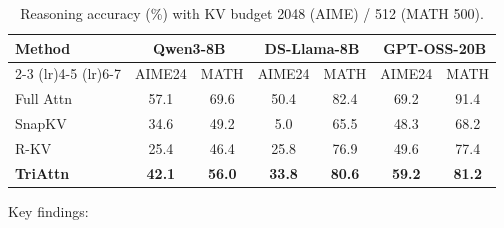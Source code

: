 \documentclass[11pt]{article}
\begin{document}
\begin{table}[h]
\centering
\caption{Reasoning accuracy (\%) with KV budget 2048 (AIME) / 512 (MATH 500).}
\begin{tabular}{lcccccc}
\toprule
\textbf{Method} & \multicolumn{2}{c}{\textbf{Qwen3-8B}} & \multicolumn{2}{c}{\textbf{DS-Llama-8B}} & \multicolumn{2}{c}{\textbf{GPT-OSS-20B}} \\
\cmidrule(lr){2-3} \cmidrule(lr){4-5} \cmidrule(lr){6-7}
 & AIME24 & MATH & AIME24 & MATH & AIME24 & MATH \\
\midrule
Full Attn & 57.1 & 69.6 & 50.4 & 82.4 & 69.2 & 91.4 \\
SnapKV & 34.6 & 49.2 & 5.0 & 65.5 & 48.3 & 68.2 \\
R-KV & 25.4 & 46.4 & 25.8 & 76.9 & 49.6 & 77.4 \\
\textbf{TriAttn} & \textbf{42.1} & \textbf{56.0} & \textbf{33.8} & \textbf{80.6} & \textbf{59.2} & \textbf{81.2} \\
\bottomrule
\end{tabular}
\end{table}

Key findings:
\end{document}
